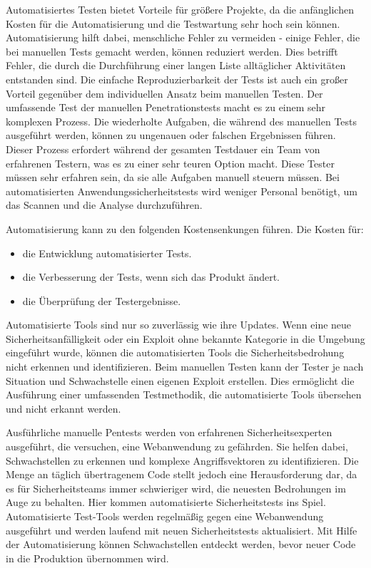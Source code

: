 Automatisiertes Testen bietet Vorteile für größere Projekte, da die anfänglichen Kosten für die Automatisierung und die Testwartung sehr hoch sein können. Automatisierung hilft dabei, menschliche Fehler zu vermeiden - einige Fehler, die bei manuellen Tests gemacht werden, können reduziert werden. Dies betrifft Fehler, die durch die Durchführung einer langen Liste alltäglicher Aktivitäten entstanden sind. 
Die einfache Reproduzierbarkeit der Tests ist auch ein großer Vorteil gegenüber dem individuellen Ansatz beim manuellen Testen.
Der umfassende Test der manuellen Penetrationstests macht es zu einem sehr komplexen Prozess. Die wiederholte Aufgaben, die während des manuellen Tests ausgeführt werden, können zu ungenauen oder falschen Ergebnissen führen.  Dieser Prozess erfordert während der gesamten Testdauer ein Team von erfahrenen Testern, was es zu einer sehr teuren Option macht. Diese Tester müssen sehr erfahren sein, da sie alle Aufgaben manuell steuern müssen. Bei automatisierten Anwendungssicherheitstests wird weniger Personal benötigt, um das Scannen und die Analyse durchzuführen\cite{autovorteil99}.

Automatisierung kann zu den folgenden Kostensenkungen führen. Die Kosten für\cite{autovorteil99}: 

\begin{itemize} 
	\item die Entwicklung automatisierter Tests.
	\item die Verbesserung der Tests, wenn sich das Produkt ändert.
	\item die Überprüfung der Testergebnisse.
\end{itemize} 

Automatisierte Tools sind nur so zuverlässig wie ihre Updates. Wenn eine neue Sicherheitsanfälligkeit oder ein Exploit ohne bekannte Kategorie in die Umgebung eingeführt wurde, können die automatisierten Tools die Sicherheitsbedrohung nicht erkennen und identifizieren. Beim manuellen Testen kann der Tester je nach Situation und Schwachstelle einen eigenen Exploit erstellen. Dies ermöglicht die Ausführung einer umfassenden Testmethodik, die automatisierte Tools übersehen und nicht erkannt werden\cite{packetlabs18}.

Ausführliche manuelle Pentests werden von erfahrenen Sicherheitsexperten ausgeführt, die versuchen, eine Webanwendung zu gefährden. Sie helfen dabei, Schwachstellen zu erkennen und komplexe Angriffsvektoren zu identifizieren. Die Menge an täglich übertragenem Code stellt jedoch eine Herausforderung dar, da es für Sicherheitsteams immer schwieriger wird, die neuesten Bedrohungen im Auge zu behalten. Hier kommen automatisierte Sicherheitstests ins Spiel. Automatisierte Test-Tools werden regelmäßig gegen eine Webanwendung ausgeführt und werden laufend mit neuen Sicherheitstests aktualisiert. Mit Hilfe der Automatisierung können Schwachstellen entdeckt werden, bevor neuer Code in die Produktion übernommen wird\cite{wmpta17}.

